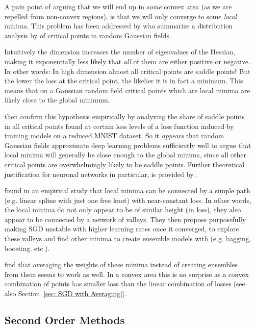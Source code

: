 A pain point of arguing that we will end up in \emph{some} convex area
(as we are repelled from non-convex regions), is that we will only 
converge to some \emph{local} minima. This problem has been addressed by
\textcite{pascanuSaddlePointProblem2014} who summarize a distribution analysis
by \textcite{brayStatisticsCriticalPoints2007} of critical points in random
Gaussian fields.

Intuitively the dimension increases the number of eigenvalues
of the Hessian, making it exponentially less likely that \emph{all} of them are
either positive or negative. In other words: In high dimension almost all
critical points are saddle points! But the lower the loss at the critical point,
the likelier it is in fact a minimum. This means that on a Gaussian random field
critical points which are local minima are likely close to the global minimum.

\textcite{pascanuSaddlePointProblem2014}
then confirm this hypothesis empirically by analyzing the share of saddle
points in all critical points found at certain loss levels of a loss function
induced by training models on a reduced MNIST dataset. So it \emph{appears} that
random Gaussian fields approximate deep learning problems sufficiently well to
argue that local minima will generally be close enough to the global minima,
since all other critical points are overwhelmingly likely to be saddle points.
Further theoretical justification for neuronal networks in particular, is
provided by \textcite{choromanskaLossSurfacesMultilayer2015}.

\textcite{garipovLossSurfacesMode2018} found in an empirical study that local
minima can be connected by a simple path (e.g. linear spline with just one
free knot) with near-constant loss. In other words, the local minima do not only
appear to be of similar height (in loss), they also appear to be connected
by a network of valleys. They then propose purposefully making SGD unstable
with higher learning rates once it converged, to explore these valleys and find
other minima to create ensemble models with (e.g. bagging, boosting, etc.). 

\textcite{izmailovAveragingWeightsLeads2019} find that averaging the weights
of these minima instead of creating ensembles from them seems to work as well.
In a convex area this is no surprise as a convex combination of points
has smaller loss than the linear combination of losses (see also
Section~\ref{sec: SGD with Averaging}).


\subsection{Second Order Methods}

